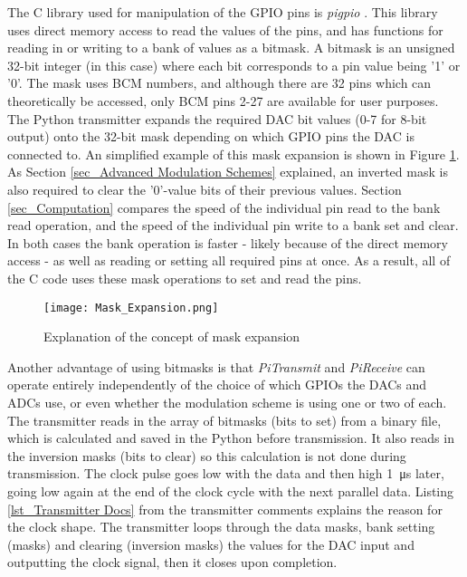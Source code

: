 \documentclass[../main.tex]{subfiles}
\begin{document}
The C library used for manipulation of the GPIO pins is \textit{pigpio} \cite{lib_pigpio}.
This library uses direct memory access to read the values of the pins, and has functions for reading in or writing to a bank of values as a bitmask.
A bitmask is an unsigned 32-bit integer (in this case) where each bit corresponds to a pin value being '1' or '0'.
The mask uses BCM numbers, and although there are 32 pins which can theoretically be accessed, only BCM pins 2-27 are available for user purposes.
The Python transmitter expands the required DAC bit values (0-7 for 8-bit output) onto the 32-bit mask depending on which GPIO pins the DAC is connected to.
An simplified example of this mask expansion is shown in Figure \ref{fig_Mask Expansion}.
As Section \ref{sec_Advanced Modulation Schemes} explained, an inverted mask is also required to clear the '0'-value bits of their previous values.
Section \ref{sec_Computation} compares the speed of the individual pin read to the bank read operation, and the speed of the individual pin write to a bank set and clear.
In both cases the bank operation is faster - likely because of the direct memory access - as well as reading or setting all required pins at once.
As a result, all of the C code uses these mask operations to set and read the pins.\\

\begin{figure}[ht]
 	\centering
 	\texttt{[image: Mask\_Expansion.png]}
 	\caption{Explanation of the concept of mask expansion}
 	\label{fig_Mask Expansion}
\end{figure}

Another advantage of using bitmasks is that \textit{PiTransmit} and \textit{PiReceive} can operate entirely independently of the choice of which GPIOs the DACs and ADCs use, or even whether the modulation scheme is using one or two of each.
The transmitter reads in the array of bitmasks (bits to set) from a binary file, which is calculated and saved in the Python before transmission.
It also reads in the inversion masks (bits to clear) so this calculation is not done during transmission.
The clock pulse goes low with the data and then high \SI{1}{\micro\second} later, going low again at the end of the clock cycle with the next parallel data.
Listing \ref{lst_Transmitter Docs} from the transmitter comments explains the reason for the clock shape.
The transmitter loops through the data masks, bank setting (masks) and clearing (inversion masks) the values for the DAC input and outputting the clock signal, then it closes upon completion.\\
\end{document}
